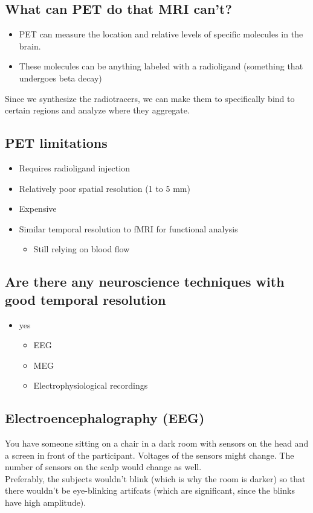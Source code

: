 \subsection{What can PET do that MRI can't?}
\begin{itemize}
    \item PET can measure the location and relative levels of specific molecules in the brain.
    \item These molecules can be anything labeled with a radioligand (something that
undergoes beta decay)
\end{itemize}
Since we synthesize the radiotracers, we can make them to specifically bind to certain regions and analyze where they aggregate.

\subsection{PET limitations}
\begin{itemize}
    \item Requires radioligand injection
    \item Relatively poor spatial resolution (1 to 5 mm)
    \item Expensive
    \item Similar temporal resolution to fMRI for functional analysis 
    \begin{itemize}
        \item Still relying on blood flow
    \end{itemize}
\end{itemize}

\subsection{Are there any neuroscience techniques with good temporal resolution}
\begin{itemize}
    \item yes
    \begin{itemize}
        \item EEG
        \item MEG
        \item Electrophysiological recordings
    \end{itemize}
\end{itemize}

\subsection{Electroencephalography (EEG)}
You have someone sitting on a chair in a dark room with sensors on the head and a screen in front of the participant. Voltages of the sensors might change. The number of sensors on the scalp would change as well.
\\Preferably, the subjects wouldn't blink (which is why the room is darker) so that there wouldn't be eye-blinking artifcats (which are significant, since the blinks have high amplitude).

